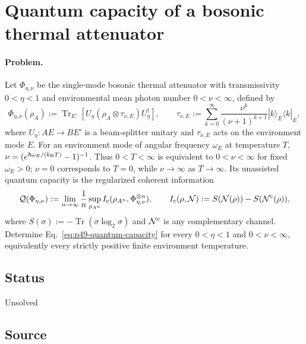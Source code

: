 \section{Quantum capacity of a bosonic thermal attenuator}
\label{sec:problem-49}

\paragraph{Problem.}
Let $\Phi_{\eta,\nu}$ be the single-mode bosonic thermal attenuator with
transmissivity $0<\eta<1$ and environmental mean photon number
$0<\nu<\infty$, defined by
\begin{equation}
  \Phi_{\eta,\nu}(\rho_A)
  :=\operatorname{Tr}_{E'}\!\left[
     U_\eta(\rho_A\otimes\tau_{\nu,E})U_\eta^\dagger
  \right],
  \qquad
  \tau_{\nu,E}:=\sum_{k=0}^{\infty}
     \frac{\nu^k}{(\nu+1)^{k+1}}
     |k\rangle_E\!\langle k|_E,
  \label{eq:p49-thermal-attenuator}
\end{equation}
where $U_\eta:AE\to BE'$ is a beam-splitter unitary and
$\tau_{\nu,E}$ acts on the environment mode $E$.  For an environment mode of
angular frequency $\omega_E$ at temperature $T$,
$\nu=(e^{\hbar\omega_E/(k_{\rm B}T)}-1)^{-1}$.  Thus $0<T<\infty$ is
equivalent to $0<\nu<\infty$ for fixed $\omega_E>0$; $\nu=0$ corresponds to
$T=0$, while $\nu\to\infty$ as $T\to\infty$.  Its unassisted quantum capacity
is the regularized coherent information
\begin{equation}
  \mathcal Q(\Phi_{\eta,\nu})
  :=\lim_{n\to\infty}\frac1n\sup_{\rho_{A^n}}
       I_{\rm c}(\rho_{A^n},\Phi_{\eta,\nu}^{\otimes n}),
  \qquad
  I_{\rm c}(\rho,\mathcal N)
  :=S(\mathcal N(\rho))-S(\mathcal N^{\rm c}(\rho)),
  \label{eq:p49-quantum-capacity}
\end{equation}
where $S(\sigma):=-\operatorname{Tr}(\sigma\log_2\sigma)$ and
$\mathcal N^{\rm c}$ is any complementary channel.  Determine
Eq.~\eqref{eq:p49-quantum-capacity} for every
$0<\eta<1$ and $0<\nu<\infty$, equivalently every strictly positive finite
environment temperature.

\subsection*{Status}

Unsolved

\subsection*{Source}

